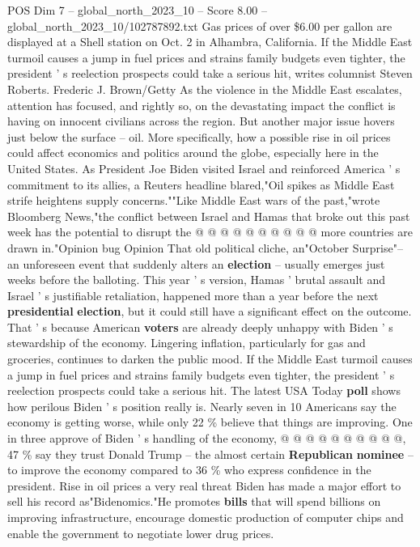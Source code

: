 \begin{textsample}{POS Dim 7 – global\_north\_2023\_10 – Score 8.00 – global\_north\_2023\_10/102787892.txt}  \label{ex:f7_pos_249}
Gas prices of over \$6.00 per gallon are displayed at a Shell station on Oct. 2 in Alhambra, California.
If the Middle East turmoil causes a jump in fuel prices and strains family budgets even tighter, the president ' s reelection prospects could take a serious hit, writes columnist Steven Roberts.
Frederic J.
Brown/Getty As the violence in the Middle East escalates, attention has focused, and rightly so, on the devastating impact the conflict is having on innocent civilians across the region.
But another major issue hovers just below the surface -- oil.
More specifically, how a possible rise in oil prices could affect economics and politics around the globe, especially here in the United States.
As President Joe Biden visited Israel and reinforced America ' s commitment to its allies, a Reuters headline blared,"Oil spikes as Middle East strife heightens supply concerns.""Like Middle East wars of the past,"wrote Bloomberg News,"the conflict between Israel and Hamas that broke out this past week has the potential to disrupt the @ @ @ @ @ @ @ @ @ @ more countries are drawn in."Opinion bug Opinion That old political cliche, an"October Surprise"-- an unforeseen event that suddenly alters an \textbf{election} -- usually emerges just weeks before the balloting.
This year ' s version, Hamas ' brutal assault and Israel ' s justifiable retaliation, happened more than a year before the next \textbf{presidential} \textbf{election}, but it could still have a significant effect on the outcome.
That ' s because American \textbf{voters} are already deeply unhappy with Biden ' s stewardship of the economy.
Lingering inflation, particularly for gas and groceries, continues to darken the public mood.
If the Middle East turmoil causes a jump in fuel prices and strains family budgets even tighter, the president ' s reelection prospects could take a serious hit.
The latest USA Today \textbf{poll} shows how perilous Biden ' s position really is.
Nearly seven in 10 Americans say the economy is getting worse, while only 22 \% believe that things are improving.
One in three approve of Biden ' s handling of the economy, @ @ @ @ @ @ @ @ @ @, 47 \% say they trust Donald Trump -- the almost certain \textbf{Republican} \textbf{nominee} -- to improve the economy compared to 36 \% who express confidence in the president.
Rise in oil prices a very real threat Biden has made a major effort to sell his record as"Bidenomics."He promotes \textbf{bills} that will spend billions on improving infrastructure, encourage domestic production of computer chips and enable the government to negotiate lower drug prices.

\end{textsample}
